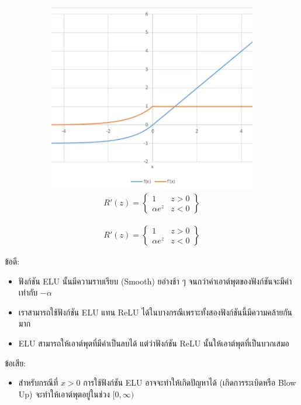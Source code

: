 \begin{itemize}
\begin{figure}[htbp]
\begin{subfigure}{0.5\textwidth}
            \includegraphics[width=0.9\linewidth]{fig/actfunc_elu_der.png}
            \caption{%
                \begin{equation}
                    \begin{split}R'(z) = \begin{Bmatrix} 1 & z>0 \\
                        \alpha e^z & z<0 \end{Bmatrix}\end{split}
                \end{equation}
            }
            \label{fig:actfunc_elu_der}
        \end{subfigure}
    \end{figure}
    ข้อดี:
    \begin{itemize}
        \item ฟังก์ชัน ELU นั้นมีความราบเรียบ (Smooth) ยอ่างช้า ๆ จนกว่าค่าเอาต์พุตของฟังก์ชันจะมีค่าเท่ากับ $-\alpha$
        
        \item เราสามารถใช้ฟังก์ชัน ELU แทน ReLU ได้ในบางกรณีเพราะทั้งสองฟังก์ชันนี้มีความคล้ายกันมาก
        
        \item ELU สามารถให้เอาต์พุตที่มีค่าเป็นลบได้ แต่ว่าฟังก์ชัน ReLU นั้นให้เอาต์พุตที่เป็นบวกเสมอ
    \end{itemize}
    ข้อเสีย:
    \begin{itemize}
        \item สำหรับกรณีที่ $x > 0$ การใช้ฟังก์ชัน ELU อาจจะทำให้เกิดปัญหาได้ (เกิดการระเบิดหรือ Blow Up) จะทำให้เอาต์พุตอยู่ในช่วง 
        $[0,\infty)$
    \end{itemize}


\end{itemize}
